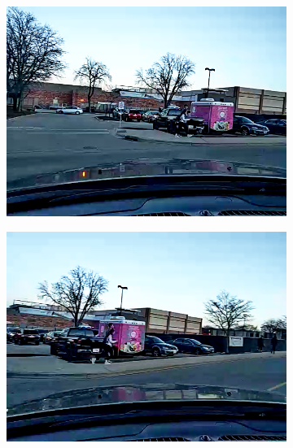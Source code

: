 \begin{figure}[!t]
   \begin{subfigure}[t]{0.25\textwidth}
    \includegraphics[width=\linewidth]{Figs/RTDrive/evaluation/frames/context_0.png}
  \end{subfigure}%
  \begin{subfigure}[t]{0.25\textwidth}
    \includegraphics[width=\linewidth]{Figs/RTDrive/evaluation/frames/context_1.png}
  \end{subfigure}%
  \begin{subfigure}[t]{0.25\textwidth}

\end{subfigure}
\end{figure}
